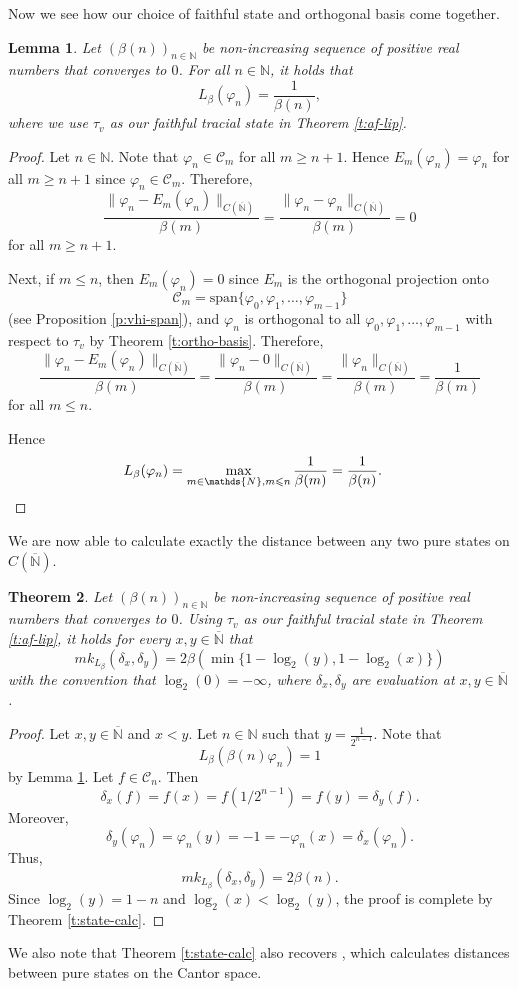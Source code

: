 \documentclass[]{amsart}
\newcommand{\ninn}{n \in \N}
\newcommand{\overn}{\overline{\N}}
\newcommand{\vhi}{{\varphi}}
\newcommand{\N}{{\mathds{N}}}
\newcommand{\cc}{{\mathcal{C}}}
\theoremstyle{plain}
\newtheorem{theorem}{Theorem}[section]
\newtheorem{lemma}[theorem]{Lemma}
\theoremstyle{definition}
\theoremstyle{remark}
\renewcommand{\geq}{\geqslant}
\renewcommand{\leq}{\leqslant}
\numberwithin{equation}{section}
\begin{document}
   
  Now we see how our choice of faithful state and orthogonal basis come together.
    
    \begin{lemma}\label{l:}
    Let $(\beta(n))_{\ninn}$ be non-increasing sequence of positive real numbers that converges to $0$. For all $\ninn$, it holds that
    \[
    L_\beta(\vhi_n)=\frac{1}{\beta(n)},
    \]
    where we use $\tau_v$ as our faithful tracial state in Theorem \ref{t:af-lip}.
    \end{lemma}
    \begin{proof}
    Let $\ninn$. Note that $\vhi_n \in \cc_m$ for all $m \geq n+1.$ Hence $E_m(\vhi_n)=\vhi_n$ for all $m \geq n+1$ since $\vhi_n \in \mathcal{C}_m$. Therefore,
    \[
    \frac{\|\vhi_n-E_m(\vhi_n)\|_{C(\overn)}}{\beta(m)}=\frac{\|\vhi_n-\vhi_n\|_{C(\overn)}}{\beta(m)}=0
    \]
    for all $m \geq n+1.$
    
    
    
    
   Next, if $m \leq n$, then $E_m(\vhi_n)=0$ since $E_m$ is the orthogonal projection onto 
    \[
    \cc_m=\mathrm{span}\{\vhi_0, \vhi_1, \ldots, \vhi_{m-1}\}
    \]
    (see Proposition \ref{p:vhi-span}), 
    and $\vhi_n$ is orthogonal to all $\vhi_0, \vhi_1, \ldots, \vhi_{m-1}$ with respect to $\tau_v$ by Theorem \ref{t:ortho-basis}.  Therefore,
    \[
    \frac{\|\vhi_n-E_m(\vhi_n)\|_{C(\overn)}}{\beta(m)}=\frac{\|\vhi_n-0\|_{C(\overn)}}{\beta(m)}=\frac{\|\vhi_n\|_{C(\overn)}}{\beta(m)}=\frac{1}{\beta(m)}
    \]
    for all $m \leq n.$
    
    Hence 
    \begin{align*}
    L_\beta (\vhi_n)&=\max_{m \in \N, m \leq n} \frac{1}{\beta(m)}=\frac{1}{\beta(n)}.\qedhere
    \end{align*}
    \end{proof}
    
 We are now able to calculate exactly the distance between any two pure states on $C(\overn)$.
    
    \begin{theorem}
     Let $(\beta(n))_{\ninn}$ be non-increasing sequence of positive real numbers that converges to $0$. Using $\tau_v$ as our faithful tracial state in Theorem \ref{t:af-lip}, 
 it holds for every $x,y \in  \overn $ that 
\[
mk_{L_\beta}(\delta_x,\delta_y)=2 \beta(\min\{1-\log_2(y), 1-\log_2(x)\}) 
\]
with the convention that $\log_2(0)=-\infty$,
  where $\delta_x,\delta_y$ are evaluation at $x,y\in \overn$.
    \end{theorem}
    \begin{proof} 
    Let $x,y \in \overn$ and $x<y$. Let $n \in \N$ such that $y=\frac{1}{2^{n-1}}$. Note that 
    \[
    L_\beta (\beta(n) \vhi_n)=1
    \]
    by Lemma \ref{l:}. Let $f \in \cc_n$. Then 
    \[\delta_x(f)=f(x)=f(1/2^{n-1})=f(y)=\delta_y(f).\] 
    Moreover,
    \[
    \delta_y(\vhi_n)=\vhi_n(y)=-1=-\vhi_n(x)=\delta_x(\vhi_n).
    \]
    Thus, 
    \[
    mk_{L_\beta}(\delta_x,\delta_y)=2\beta(n).
    \]
    Since $\log_2(y)=1-n$ and $\log_2(x)<\log_2(y)$, the proof is complete by Theorem \ref{t:state-calc}.
    \end{proof}

We also note that Theorem \ref{t:state-calc}   also recovers \cite[Theorem 7.5]{Aguilar-Latremoliere15}, which calculates distances between pure states on the Cantor space.




    
 
   
    

\vfill
\end{document}

